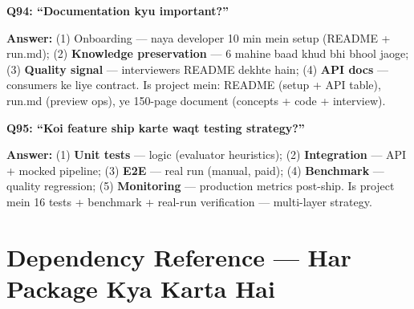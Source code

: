 \begin{interviewbox}
\textbf{Q94: ``Documentation kyu important?''}

\textbf{Answer:} (1) Onboarding --- naya developer 10 min mein setup (README + run.md); (2) \textbf{Knowledge preservation} --- 6 mahine baad khud bhi bhool jaoge; (3) \textbf{Quality signal} --- interviewers README dekhte hain; (4) \textbf{API docs} --- consumers ke liye contract. Is project mein: README (setup + API table), run.md (preview ops), ye 150-page document (concepts + code + interview).
\end{interviewbox}

\begin{interviewbox}
\textbf{Q95: ``Koi feature ship karte waqt testing strategy?''}

\textbf{Answer:} (1) \textbf{Unit tests} --- logic (evaluator heuristics); (2) \textbf{Integration} --- API + mocked pipeline; (3) \textbf{E2E} --- real run (manual, paid); (4) \textbf{Benchmark} --- quality regression; (5) \textbf{Monitoring} --- production metrics post-ship. Is project mein 16 tests + benchmark + real-run verification --- multi-layer strategy.
\end{interviewbox}

\section{Dependency Reference --- Har Package Kya Karta Hai}

